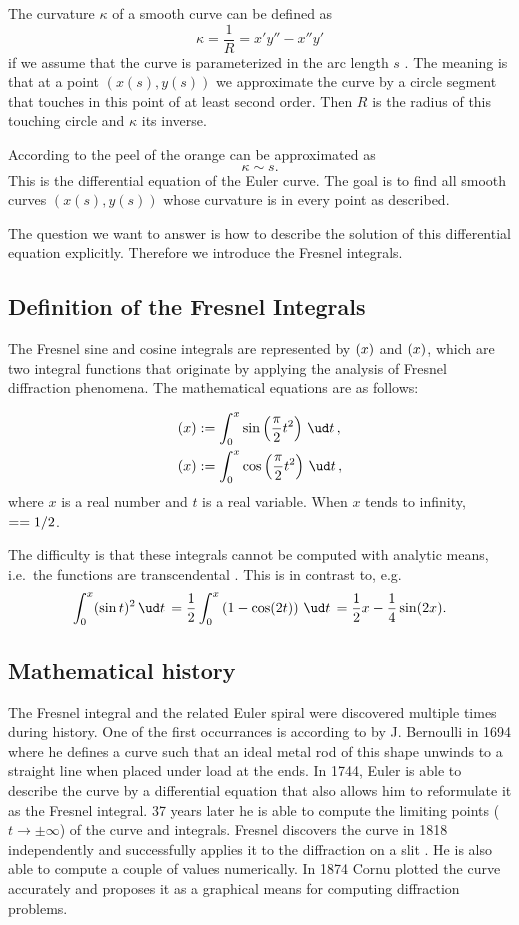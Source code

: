 \documentclass[12pt]{article}
\let\C=\relax
\DeclareMathOperator\C{C} %
\def\d#1{{\,\ud#1\,}}
\let\S=\relax
\DeclareMathOperator\S{S} %
\begin{document}
The curvature $\kappa$ of a smooth curve can be defined as 
\[  \kappa=\frac1R = x'y'' -x''y'
\] if we assume that the curve is parameterized in the arc length $s$ \cite{BH12}.  The meaning is that at a point $(x(s),y(s))$ we approximate the curve by a circle segment that touches in this point of at least second order.  Then $R$ is the radius of this touching circle and $\kappa$ its inverse.

According to \cite{BH12} the peel of the orange can be approximated as
\begin{equation}
  \kappa \sim s  \label{e:eulerSpiral}.
\end{equation}  This is the differential equation of the Euler curve.  The goal is to find all smooth curves $(x(s),y(s))$ whose curvature is in every point as described.

The question we want to answer is how to describe the solution of this differential equation explicitly.  Therefore we introduce the Fresnel integrals.


\subsection{Definition of the Fresnel Integrals}
The Fresnel sine and cosine integrals are represented by $\S(x)$ and $\C(x)$, which are two integral functions that originate by applying the analysis of Fresnel diffraction phenomena. The mathematical equations are as follows:

\begin{align}
  \S(x) &:= \int_0^x  \sin\left(\frac\pi2 t^2\right) \d{t}, \\
  \C(x) &:= \int_0^x \cos\left(\frac\pi2 t^2\right) \d{t},
\end{align}
where $x$ is a real number and $t$ is a real variable. When $x$ tends to infinity, $\S=\C=1/2$.

The difficulty is that these integrals cannot be computed with analytic means, i.e.~the functions are transcendental \cite[p.195ff]{AS}.  This is in contrast to, e.g.
$$ \int_0^x (\sin t)^2 \d{t} = \frac12\int_0^x \left(1-\cos(2t)\right)\d{t} = \frac12x -\frac14\sin(2x).
$$


\subsection{Mathematical history}
The Fresnel integral and the related Euler spiral were discovered multiple times during history.  One of the first occurrances is according to \cite{Lev08} by J. Bernoulli in 1694 where he defines a curve such that an ideal metal rod of this shape unwinds to a straight line when placed under load at the ends.  In 1744, Euler is able to describe the curve by a differential equation that also allows him to reformulate it as the Fresnel integral.  37 years later he is able to compute the limiting points ($t\to\pm\infty$) of the curve and integrals.  Fresnel discovers the curve in 1818 independently and successfully applies it to the diffraction on a slit \cite{Lev08}.  He is also able to compute a couple of values numerically.  In 1874 Cornu plotted the curve accurately and proposes it as a graphical means for computing diffraction problems.
\end{document}
